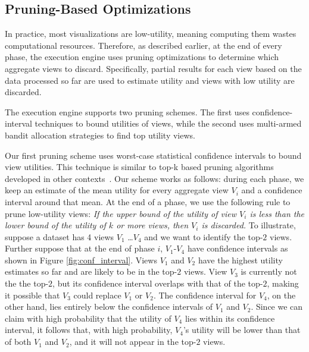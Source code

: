

\subsection{Pruning-Based Optimizations}
\label{sec:pruning_opt}
In practice, most visualizations are low-utility, meaning computing them wastes computational resources.
Therefore, as described earlier, at the end of every phase, 
the execution engine uses pruning optimizations to determine which 
aggregate views to discard.
Specifically, partial results for each view based on the data processed
so far are used to estimate utility and views with low utility are discarded.

The \SeeDB execution engine supports two pruning schemes. The first uses 
confidence-interval techniques to bound utilities of views, while the second uses
multi-armed bandit allocation strategies to find top utility views.





\label{sec:confidence_interval}
Our first pruning scheme uses worst-case statistical confidence intervals to
bound view utilities.
This technique is similar to top-k based pruning algorithms developed 
in other contexts~\cite{DBLP:conf/pods/FaginLN01, 
DBLP:conf/vldb/IlyasAE04, DBLP:conf/ICDE/ReDS07}.
Our scheme works as follows: during each phase,
we keep an estimate of the mean utility for every aggregate view $V_i$ and a
confidence interval around that mean.
At the end of a phase, we use the following rule to prune low-utility
views:
{\em If the upper bound of the utility of view $V_i$ is less
than the lower bound of the utility of $k$ or more views, then $V_i$ is discarded.}
To illustrate, suppose a dataset has 4 views $V_1$ \ldots $V_4$ and we want to 
identify the top-$2$ views.
Further suppose that at the end of phase $i$,
$V_1$-$V_4$ have confidence intervals as shown in Figure \ref{fig:conf_interval}.
Views $V_1$ and $V_2$ have the highest utility estimates so far and are
likely to be in the top-$2$ views.
View $V_3$ is currently not the the top-$2$, but its confidence interval overlaps
with that of the top-$2$, making it possible that $V_3$ could replace $V_1$ or $V_2$.
The confidence interval for $V_4$, on the other hand, lies entirely below the confidence
intervals of $V_1$ and $V_2$.
Since we can claim with high probability
that the utility of $V_4$ lies within its confidence interval, it follows that,
with high probability, $V_4$'s utility will be lower than that of both $V_1$ and
$V_2$, and it will not appear in the top-$2$ views.

